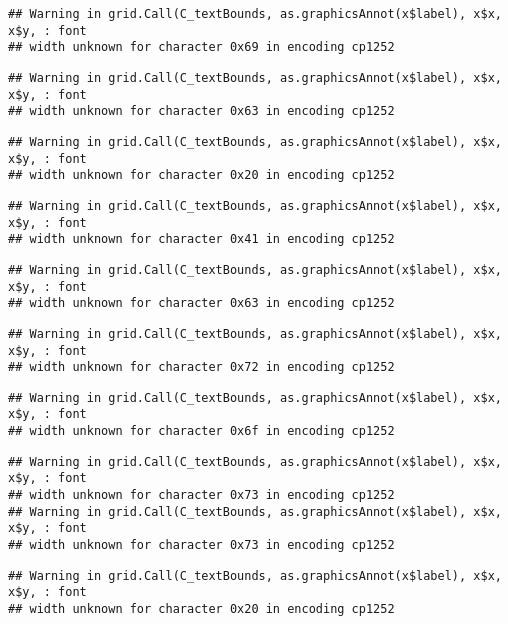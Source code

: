 \documentclass[
]{article}
\begin{document}
\begin{verbatim}
## Warning in grid.Call(C_textBounds, as.graphicsAnnot(x$label), x$x, x$y, : font
## width unknown for character 0x69 in encoding cp1252
\end{verbatim}

\begin{verbatim}
## Warning in grid.Call(C_textBounds, as.graphicsAnnot(x$label), x$x, x$y, : font
## width unknown for character 0x63 in encoding cp1252
\end{verbatim}

\begin{verbatim}
## Warning in grid.Call(C_textBounds, as.graphicsAnnot(x$label), x$x, x$y, : font
## width unknown for character 0x20 in encoding cp1252
\end{verbatim}

\begin{verbatim}
## Warning in grid.Call(C_textBounds, as.graphicsAnnot(x$label), x$x, x$y, : font
## width unknown for character 0x41 in encoding cp1252
\end{verbatim}

\begin{verbatim}
## Warning in grid.Call(C_textBounds, as.graphicsAnnot(x$label), x$x, x$y, : font
## width unknown for character 0x63 in encoding cp1252
\end{verbatim}

\begin{verbatim}
## Warning in grid.Call(C_textBounds, as.graphicsAnnot(x$label), x$x, x$y, : font
## width unknown for character 0x72 in encoding cp1252
\end{verbatim}

\begin{verbatim}
## Warning in grid.Call(C_textBounds, as.graphicsAnnot(x$label), x$x, x$y, : font
## width unknown for character 0x6f in encoding cp1252
\end{verbatim}

\begin{verbatim}
## Warning in grid.Call(C_textBounds, as.graphicsAnnot(x$label), x$x, x$y, : font
## width unknown for character 0x73 in encoding cp1252
## Warning in grid.Call(C_textBounds, as.graphicsAnnot(x$label), x$x, x$y, : font
## width unknown for character 0x73 in encoding cp1252
\end{verbatim}

\begin{verbatim}
## Warning in grid.Call(C_textBounds, as.graphicsAnnot(x$label), x$x, x$y, : font
## width unknown for character 0x20 in encoding cp1252
\end{verbatim}
\end{document}
